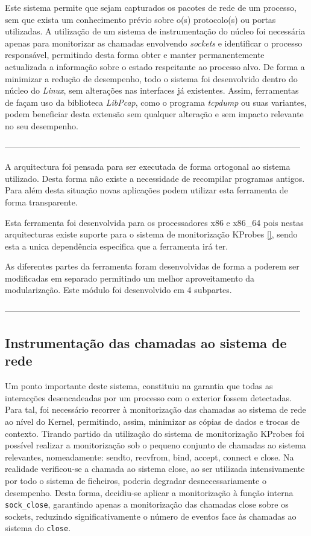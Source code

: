 Este sistema permite que sejam capturados os pacotes de rede de um processo, sem que exista um conhecimento prévio sobre o(s) protocolo(s) ou portas utilizadas.
 A utilização de um sistema de instrumentação do núcleo foi necessária apenas para monitorizar as chamadas envolvendo \emph{sockets} e identificar o processo responsável, permitindo desta forma obter e manter permanentemente actualizada a informação sobre o estado respeitante ao processo alvo.
 De forma a minimizar a redução de desempenho, todo o sistema foi desenvolvido dentro do núcleo do \textit{Linux}, sem alterações nas interfaces já existentes.
 Assim, ferramentas de façam uso da biblioteca \textit{LibPcap}, como o programa \textit{tcpdump} ou suas variantes, podem beneficiar desta extensão sem qualquer alteração e sem impacto relevante no seu desempenho.

---------------------------------------------------------------------------------------------------------

A arquitectura foi pensada para ser executada de forma ortogonal ao sistema utilizado.
 Desta forma não existe a necessidade de recompilar programas antigos.
 Para além desta situação novas aplicações podem utilizar esta ferramenta de forma transparente.

Esta ferramenta foi desenvolvida para os processadores x86 e x86\_64 pois nestas arquitecturas existe suporte para o sistema de monitorização KProbes \ref{}, sendo esta a unica dependência especifica que a ferramenta irá ter.

As diferentes partes da ferramenta foram desenvolvidas de forma a poderem ser modificadas em separado permitindo um melhor aproveitamento da modularização.
Este módulo foi desenvolvido em 4 subpartes. 

---------------------------------------------------------------------------------------------------------


\subsection*{Instrumentação das chamadas ao sistema de rede}
\label{sub:mon_syscalls}

Um ponto importante deste sistema, constituiu na garantia que todas as interacções desencadeadas por um processo com o exterior fossem detectadas. Para tal, foi necessário recorrer à monitorização das chamadas ao sistema de rede ao nível do Kernel, permitindo, assim, minimizar as cópias de dados e trocas de contexto. Tirando partido da utilização do sistema de monitorização KProbes foi possível realizar a monitorização sob o pequeno conjunto de chamadas ao sistema relevantes, nomeadamente: sendto, recvfrom, bind, accept, connect e close.
 Na realidade verificou-se a chamada ao sistema close, ao ser utilizada intensivamente por todo o sistema de ficheiros, poderia degradar desnecessariamente o desempenho. Desta forma, decidiu-se aplicar a monitorização à função interna \texttt{sock\_close}, garantindo apenas a monitorização das chamadas close sobre os sockets, reduzindo significativamente o número de eventos face às chamadas ao sistema do \texttt{close}.

